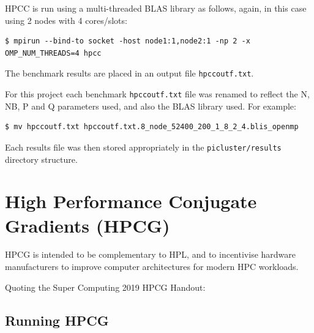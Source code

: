\documentclass{report}
\begin{document}
HPCC is run using a multi-threaded BLAS library as follows, again, in this case using 2 nodes with 4 cores/slots:

\lstset{style=type}
\begin{lstlisting}
$ mpirun --bind-to socket -host node1:1,node2:1 -np 2 -x OMP_NUM_THREADS=4 hpcc
\end{lstlisting}

The benchmark results are placed in an output file \verb|hpccoutf.txt|.  

For this project each benchmark \verb|hpccoutf.txt| file was renamed to reflect the N, NB, P and Q parameters used, and also the BLAS library used. For example:

\lstset{style=type}
\begin{lstlisting}
$ mv hpccoutf.txt hpccoutf.txt.8_node_52400_200_1_8_2_4.blis_openmp
\end{lstlisting}

Each results file was then stored appropriately in the \verb|picluster/results| directory structure. 


%
%
\section{High Performance Conjugate Gradients (HPCG)}

HPCG is intended to be complementary to HPL, and to incentivise hardware manufacturers to improve computer architectures for modern HPC workloads. 

Quoting the Super Computing 2019 HPCG Handout:




%
%
\subsection{Running HPCG}
\end{document}
